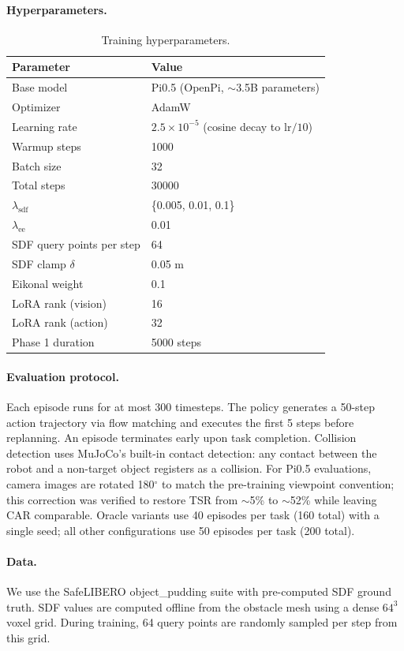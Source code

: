\paragraph{Hyperparameters.}
\begin{table}[h]
\centering
\caption{Training hyperparameters.}
\label{tab:hyperparams}
\begin{tabular}{ll}
\toprule
Parameter & Value \\
\midrule
Base model & Pi0.5 (OpenPi, $\sim$3.5B parameters) \\
Optimizer & AdamW \\
Learning rate & $2.5 \times 10^{-5}$ (cosine decay to $\mathrm{lr}/10$) \\
Warmup steps & 1000 \\
Batch size & 32 \\
Total steps & 30000 \\
$\lambda_\mathrm{sdf}$ & \{0.005, 0.01, 0.1\} \\
$\lambda_\mathrm{ee}$ & 0.01 \\
SDF query points per step & 64 \\
SDF clamp $\delta$ & 0.05 m \\
Eikonal weight & 0.1 \\
LoRA rank (vision) & 16 \\
LoRA rank (action) & 32 \\
Phase 1 duration & 5000 steps \\
\bottomrule
\end{tabular}
\end{table}

\paragraph{Evaluation protocol.}
Each episode runs for at most 300 timesteps. The policy generates a 50-step action trajectory via flow matching and executes the first 5 steps before replanning. An episode terminates early upon task completion. Collision detection uses MuJoCo's built-in contact detection: any contact between the robot and a non-target object registers as a collision. For Pi0.5 evaluations, camera images are rotated 180$^\circ$ to match the pre-training viewpoint convention; this correction was verified to restore TSR from ${\sim}$5\% to ${\sim}$52\% while leaving CAR comparable. Oracle variants use 40 episodes per task (160 total) with a single seed; all other configurations use 50 episodes per task (200 total).

\paragraph{Data.}
We use the SafeLIBERO object\_pudding suite with pre-computed SDF ground truth. SDF values are computed offline from the obstacle mesh using a dense $64^3$ voxel grid. During training, 64 query points are randomly sampled per step from this grid.

